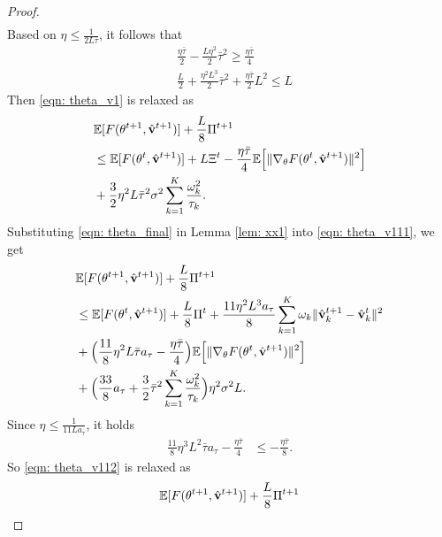 \documentclass[twoside,journal]{IEEEtran}
\def\VectorFont{\bf}
\newcommand{\vv}{{\VectorFont v}}
\begin{document}
\begin{proof}
\begin{align}
\end{align}
Based on $\eta\leq \frac{1}{2L\bar{\tau}}$, it follows that
\begin{align*}
&\frac{\eta\bar{\tau} }{2}-\frac{L\eta^2}{2}\bar{\tau}^2\geq
\frac{\eta\bar{\tau} }{4}\\
&\frac{L}{2}+\frac{\eta^2L^3}{2}\bar{\tau}^2
+\frac{\eta\bar{\tau}}{2}L^2\leq L
\end{align*}
 Then \eqref{eqn: theta_v1} is relaxed as
\begin{align}\label{eqn: theta_v111}
\nonumber&\mathbb{E}[F(\theta^{t+1},\hat{\vv}^{t+1})]+\frac{L}{8}\Pi^{t+1}\\
\nonumber&\leq \mathbb{E}[F(\theta^{t},\hat{\vv}^{t+1})]+L\Xi^t
-\frac{\eta\bar{\tau} }{4}\mathbb{E}\Big[\|\nabla_{\theta}F(\theta^t,\hat{\vv}^{t+1})\|^2\Big]\\
&+\frac{3}{2}\eta^2L\bar{\tau}^2\sigma^2\sum_{k=1}^K\frac{\omega_k^2}{\tau_k}.
\end{align}
Substituting \eqref{eqn: theta_final} in Lemma \ref{lem: xx1} into \eqref{eqn: theta_v111}, we get
\begin{align}\label{eqn: theta_v112}
\nonumber&\mathbb{E}[F(\theta^{t+1},\hat{\vv}^{t+1})]+\frac{L}{8}\Pi^{t+1}\\
\nonumber&\leq \mathbb{E}[F(\theta^{t},\hat{\vv}^{t+1})]+\frac{L}{8}\Pi^{t}+\frac{11\eta^2L^3a_{\tau}}{8}\sum_{k=1}^K\omega_k\|\hat{\vv}_k^{t+1}-
\hat \vv_k^{t}\|^2\\
\nonumber&+\Big(\frac{11}{8}\eta^2L\bar{\tau}a_{\tau}-\frac{\eta\bar{\tau} }{4}\Big)\mathbb{E}\Big[\|
\nabla_{\theta}F(\theta^{t},\hat{\vv}^{t+1})
\|^2\Big]\\
&+\Big(\frac{33}{8}a_{\tau}
+\frac{3}{2}\bar{\tau}^2\sum_{k=1}^K\frac{\omega_k^2}{\tau_k}\Big)\eta^2\sigma^2L.
\end{align}
Since $\eta\leq \frac{1}{11La_{\tau}}$, it holds
\begin{align*}
\frac{11}{8}\eta^3L^2\bar{\tau}a_{\tau}-\frac{\eta\bar{\tau} }{4}&\leq -\frac{\eta\bar{\tau} }{8}.
 \end{align*}
  So \eqref{eqn: theta_v112} is relaxed as
\begin{align}\label{eqn: theta_v113}
\nonumber&\mathbb{E}[F(\theta^{t+1},\hat{\vv}^{t+1})]+\frac{L}{8}\Pi^{t+1}\\

\end{align}
\end{proof}
\end{document}
